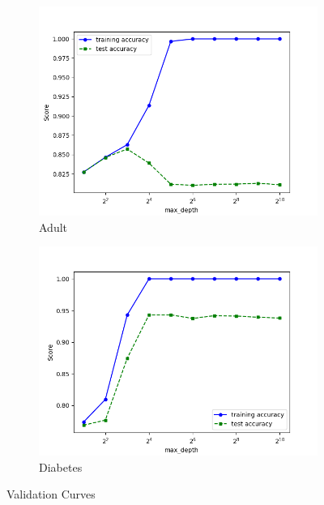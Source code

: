 \documentclass[11pt, twocolumn]{article}
\begin{document}
    \begin{figure}[!htbp]
        \begin{subfigure}{.24\textwidth}
            \centering
            \includegraphics[width=.9\textwidth]{validations_Adult_DT_max_depth}
            \caption{Adult}
            \label{fig:validations_Adult_DT_max_depth}
        \end{subfigure}
        \begin{subfigure}{.24\textwidth}
            \centering
            \includegraphics[width=.9\textwidth]{validations_Diabetes_DT_max_depth}
            \caption{Diabetes}
            \label{fig:validations_Diabetes_DT_max_depth}
        \end{subfigure}
        \caption{Validation Curves}
    \end{figure}
    \FloatBarrier
\end{document}
